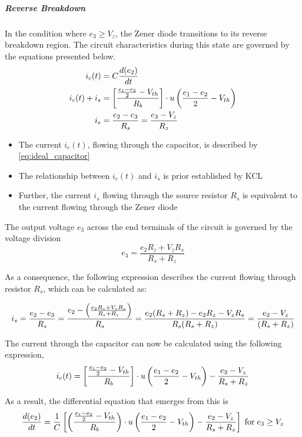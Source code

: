 \subparagraph{Reverse Breakdown}
In the condition where $e_3 \geq V_z$, the Zener diode transitions to its reverse breakdown region. The circuit characteristics during this state are governed by the equations presented below.
\begin{align}
    i_c(t) &= C\frac{d(e_2)}{dt}\\
    i_c(t) + i_s &= \left[\frac{\frac{e_1 - e_2}{2} - V_{th}}{R_b} \right]\cdot u\left(\frac{e_1 - e_2}{2} - V_{th} \right)\\
    i_s &= \frac{e_2-e_3}{R_s}=\frac{e_3-V_z}{R_z}
\end{align}
\begin{itemize}
	\item The current $i_c(t)$, flowing through the capacitor, is described by \eqref{eq:ideal_capacitor}
	\item The relationship between $i_c(t)$ and $i_s$ is prior established by KCL
	\item Further, the current $i_s$ flowing through the source resistor $R_s$ is equivalent to the current flowing through the Zener diode
\end{itemize}

The output voltage $e_3$ across the end terminals of the circuit is governed by the voltage division
\begin{equation}
    e_3=\frac{e_2R_z+V_zR_s}{R_s+R_z}
    \label{eq:noLoad_e3}
\end{equation}

As a consequence, the following expression describes the current flowing through resistor $R_s$, which can be calculated as:

\begin{equation}
    i_s=\frac{e_2-e_3}{R_s}=\frac{e_2-\left(\frac{e_2R_z+V_zR_s}{R_s+R_z} \right)}{R_s}=\frac{e_2(R_s+R_z)-e_2R_z-V_zR_s}{R_s(R_s+R_z)}=\frac{e_2-V_z}{(R_s+R_z)}
\end{equation}

The current through the capacitor can now be calculated using the following expression,
\begin{equation}
    i_c(t) = \left[\frac{\frac{e_1 - e_2}{2} - V_{th}}{R_b} \right]\cdot u\left(\frac{e_1 - e_2}{2} - V_{th} \right)-\frac{e_2-V_z}{R_s+R_z}
\end{equation}

As a result, the differential equation that emerges from this is
\begin{equation}
    \frac{d(e_2)}{dt}=\frac{1}{C}\left[\left(\frac{\frac{e_1 - e_2}{2} - V_{th}}{R_b} \right)\cdot u\left(\frac{e_1 - e_2}{2} - V_{th} \right)-\frac{e_2-V_z}{R_s+R_z} \right] \hspace{0.1cm} \text{for} \hspace{0.1cm} e_3 \geq V_z
    \label{eq:noLoad_diffEq2}
\end{equation}

